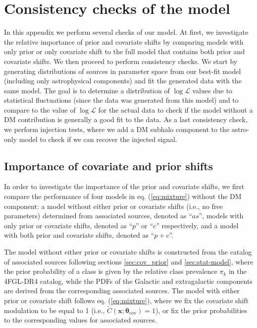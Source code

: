 \documentclass[12pt, a4paper]{article}
\newcommand{\bx}{\textbf{x}}
\newcommand{\btheta}{\boldsymbol{\theta}}
\begin{document}
\section{Consistency checks of the model}
\label{app:MC}


In this appendix we perform several checks of our model.
At first, we investigate the relative importance of prior and covariate shifts by comparing models with only prior or only covariate shift to the full model that contains both prior and covariate shifts. 
We then proceed to perform consistency checks. We start by generating distributions of sources in parameter space from our best-fit model (including only astrophysical components) and fit the generated data with the same model.
The goal is to determine a distribution of $\log\mathcal{L}$ values due to statistical fluctuations (since the data was generated from this model) and to compare to the value of $\log\mathcal{L}$ for the actual data to check if the model without a DM contribution is generally a good fit to the data.
As a last consistency check, we perform injection tests, where we add a DM subhalo component to the astro-only model to check if we can recover the injected signal.

\subsection{Importance of covariate and prior shifts}
\label{app:prior_vs_cov}

In order to investigate the importance of the prior and covariate shifts, 
we first compare the performance of four models in eq. (\ref{eq:mixture}) without the DM component: a model without either prior or covariate shifts (i.e., no free parameters) determined from associated sources, denoted as ``$as$'', models with only prior or covariate shifts, denoted as ``$p$'' or ``$c$'' respectively, and a model with both prior and covariate shifts, denoted as ``$p+c$''. 

The model without either prior or covariate shifts is constructed from the catalog of associated sources following sections \ref{sec:cov_prior} and \ref{sec:stat-model}, where the prior probability of a class is given by the relative class prevalence $\pi_k$ in the 4FGL-DR4 catalog, while the PDFs of the Galactic and extragalactic components are derived from the corresponding associated sources.
The model with either prior or covariate shift follows eq. (\ref{eq:mixture}), 
where we fix the covariate shift modulation to be equal to 1 (i.e., $\tilde{C}(\bx; \btheta_\textrm{cov}) = 1$), or fix the prior probabilities to the corresponding values for associated sources.
\end{document}
